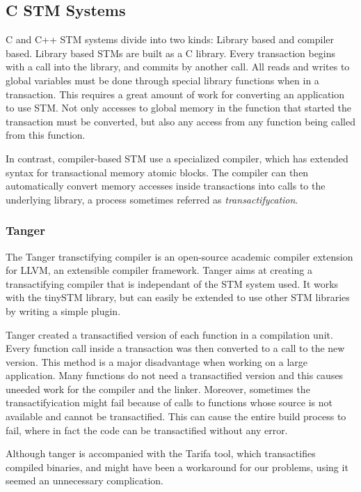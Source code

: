 \documentclass[preprint,natbib,11pt]{sigplanconf}
\begin{document}
\subsection{C STM Systems}
C and C++ STM systems divide into two kinds: Library based and compiler based.
Library based STMs are built as a C library. Every transaction begins with a
call into the library, and commits by another call. All reads and writes to
global variables must be done through special library functions when in a
transaction. This requires a great amount of work for converting an application
to use STM. Not only accesses to global memory in the function that started the
transaction must be converted, but also any access from any function being
called from this function. 

In contrast, compiler-based STM use a specialized compiler, which has extended
syntax for transactional memory atomic blocks. The compiler can then
automatically convert memory accesses inside transactions into calls to the
underlying library, a process sometimes referred as \emph{transactifycation}. 

\subsubsection{Tanger}
The Tanger\cite{felber2007tanger} transctifying compiler is an open-source academic
compiler extension for LLVM\cite{LLVM:CGO04}, an extensible compiler framework.
Tanger aims at creating a transactifying compiler that is independant of the STM
system used. It works with the tinySTM\cite{felber2008tinystm} library, but can
easily be extended to use other STM libraries by writing a simple plugin.

Tanger created a transactified version of each function in a compilation unit.
Every function call inside a transaction was then converted to a call to the new
version. This method is a major disadvantage when working on a large
application. Many functions do not need a transactified version and this causes
uneeded work for the compiler and the linker. Moreover, sometimes the
transactifyication might fail because of calls to functions whose source is not
available and cannot be transactified. This can cause the entire build process
to fail, where in fact the code can be transactified without any error.

Although tanger is accompanied with the Tarifa tool, which transactifies
compiled binaries, and might have been a workaround for our problems, using it
seemed an unnecessary complication.
\end{document}
